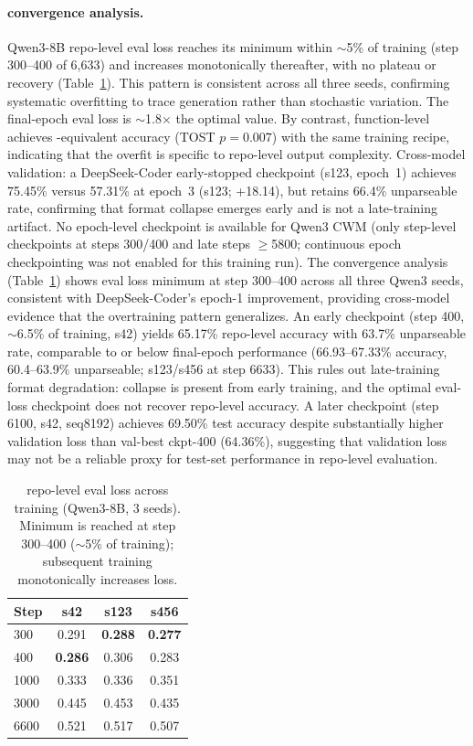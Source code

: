\paragraph{\cwm{} convergence analysis.}
\label{app:cwm_convergence}
Qwen3-8B \cwm{} repo-level eval loss reaches its minimum within ${\sim}$5\% of training (step 300--400 of 6{,}633) and increases monotonically thereafter, with no plateau or recovery (Table~\ref{tab:cwm_convergence}). This pattern is consistent across all three seeds, confirming systematic overfitting to trace generation rather than stochastic variation. The final-epoch eval loss is ${\sim}$1.8$\times$ the optimal value. By contrast, function-level \cwm{} achieves \cls{}-equivalent accuracy (TOST $p{=}0.007$) with the same training recipe, indicating that the overfit is specific to repo-level output complexity. Cross-model validation: a DeepSeek-Coder early-stopped checkpoint (s123, epoch~1) achieves 75.45\% versus 57.31\% at epoch~3 (s123; +18.14\pp{}), but retains 66.4\% unparseable rate, confirming that format collapse emerges early and is not a late-training artifact. No epoch-level checkpoint is available for Qwen3 CWM (only step-level checkpoints at steps 300/400 and late steps ${\geq}$5800; continuous epoch checkpointing was not enabled for this training run). The convergence analysis (Table~\ref{tab:cwm_convergence}) shows eval loss minimum at step 300--400 across all three Qwen3 seeds, consistent with DeepSeek-Coder's epoch-1 improvement, providing cross-model evidence that the overtraining pattern generalizes. An early checkpoint (step 400, ${\sim}$6.5\% of training, s42) yields 65.17\% repo-level accuracy with 63.7\% unparseable rate, comparable to or below final-epoch performance (66.93--67.33\% accuracy, 60.4--63.9\% unparseable; s123/s456 at step 6633). This rules out late-training format degradation: collapse is present from early training, and the optimal eval-loss checkpoint does not recover repo-level accuracy. A later checkpoint (step 6100, s42, seq8192) achieves 69.50\% test accuracy despite substantially higher validation loss than val-best ckpt-400 (64.36\%), suggesting that validation loss may not be a reliable proxy for test-set performance in \cwm{} repo-level evaluation.

\begin{table}[h]
\centering
\small
\caption{\cwm{} repo-level eval loss across training (Qwen3-8B, 3 seeds). Minimum is reached at step 300--400 (${\sim}$5\% of training); subsequent training monotonically increases loss.}
\label{tab:cwm_convergence}
\begin{tabular}{lccc}
\toprule
Step & s42 & s123 & s456 \\
\midrule
300 & 0.291 & \textbf{0.288} & \textbf{0.277} \\
400 & \textbf{0.286} & 0.306 & 0.283 \\
1000 & 0.333 & 0.336 & 0.351 \\
3000 & 0.445 & 0.453 & 0.435 \\
6600 & 0.521 & 0.517 & 0.507 \\
\bottomrule
\end{tabular}
\end{table}

